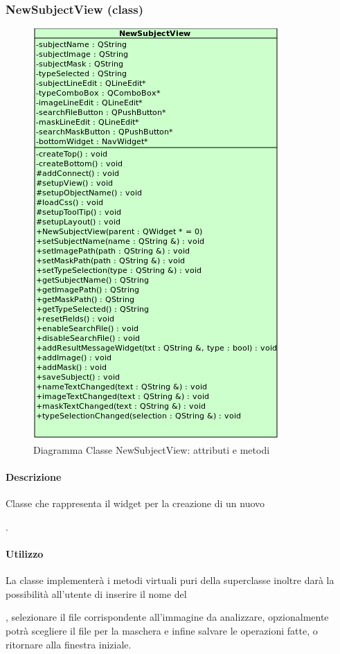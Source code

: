 \subsubsection{NewSubjectView (class)}
\label{speNsubV}
\begin{figure}[!h]
\centering
			\includegraphics[width=0.7\linewidth]{./Content/Immagini/view/NewSubjectView.png}
			\caption{Diagramma Classe NewSubjectView: attributi e metodi}
			\label{cl_nsubview}
\end{figure}
\paragraph{Descrizione \\}
Classe che rappresenta il widget per la creazione di un nuovo \subject{}.
\paragraph{Utilizzo\\}
La classe implementerà i metodi virtuali puri della superclasse inoltre darà la possibilità all'utente di inserire il nome del \subject{}, selezionare il file corrispondente all'immagine da analizzare, opzionalmente potrà scegliere il file per la maschera e infine salvare le operazioni fatte, o ritornare alla finestra iniziale.
